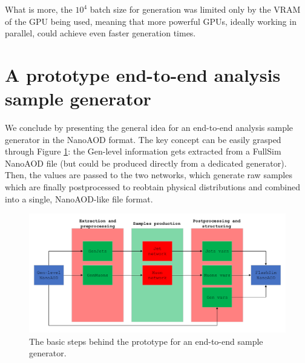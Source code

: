 What is more, the $10^{4}$ batch size for generation was limited only by the VRAM of the GPU being used, meaning that more powerful GPUs, ideally working in parallel, could achieve even faster generation times.


\section{A prototype end-to-end analysis sample generator}\label{sec:progen}

We conclude by presenting the general idea for an end-to-end analysis sample generator in the NanoAOD format. The key concept can be easily grasped through Figure \ref{fig:endtoend}: the Gen-level information gets extracted from a FullSim NanoAOD file (but could be produced directly from a dedicated generator). Then, the values are passed to the two networks, which generate raw samples which are finally postprocessed to reobtain physical distributions and combined into a single, NanoAOD-like file format.

\begin{figure}
    \centering
    \includegraphics[width=\linewidth]{gfx/ch5/endtoend.pdf}
    \caption[end-toend sample generator]{The basic steps behind the prototype for an end-to-end sample generator.}
    \label{fig:endtoend}
\end{figure}


